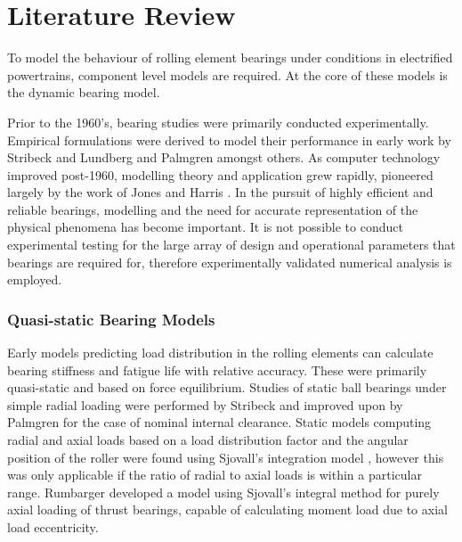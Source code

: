 \chapter{Literature Review}
\label{Literature Review}

To model the behaviour of rolling element bearings under conditions in electrified powertrains, component level models are required. At the core of these models is the dynamic bearing model.

Prior to the 1960’s, bearing studies were primarily conducted experimentally. Empirical formulations were derived to model their performance in early work by Stribeck \cite{Stribeck1907} and Lundberg and Palmgren \cite{Lundberg1952} \cite{Palmgren1959} amongst others. As computer technology improved post-1960, modelling theory and application grew rapidly, pioneered largely by the work of Jones \cite{Jones1960} and Harris \cite{Harris1984}. In the pursuit of highly efficient and reliable bearings, modelling and the need for accurate representation of the physical phenomena has become important. It is not possible to conduct experimental testing for the large array of design and operational parameters that bearings are required for, therefore experimentally validated numerical analysis is employed.

\subsection{Quasi-static Bearing Models}

Early models predicting load distribution in the rolling elements can calculate bearing stiffness and fatigue life with relative accuracy. These were primarily quasi-static and based on force equilibrium. Studies of static ball bearings under simple radial loading were performed by Stribeck \cite{Stribeck1907} and improved upon by Palmgren \cite{Palmgren1959} for the case of nominal internal clearance. Static models computing radial and axial loads based on a load distribution factor and the angular position of the roller were found using Sjovall’s integration model \cite{Sjovall1933}, however this was only applicable if the ratio of radial to axial loads is within a particular range. Rumbarger \cite{JRumbarger1962} developed a model using Sjovall’s integral method for purely axial loading of thrust bearings, capable of calculating moment load due to axial load eccentricity. 

